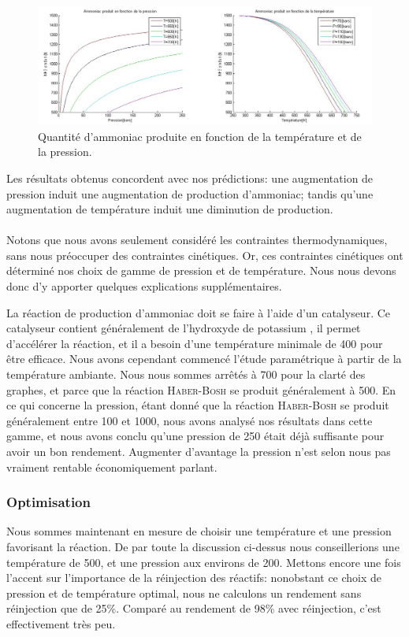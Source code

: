 \begin{figure}[ht!]
\centering
\includegraphics[scale=0.4]{fct_pression.jpg}
\caption{Quantité d'ammoniac produite en fonction de la température et de la pression.}
\label{fct_pression}
\end{figure}

Les résultats obtenus concordent avec nos prédictions: une augmentation de pression induit une augmentation de production d'ammoniac; tandis qu'une augmentation de température induit une
diminution de production.

\paragraph{} Notons que nous avons seulement considéré les contraintes thermodynamiques, sans nous préoccuper des contraintes
cinétiques. Or, ces contraintes cinétiques ont déterminé nos choix de gamme de pression et de température. Nous nous
devons donc d'y apporter quelques explications supplémentaires.

La réaction de production d'ammoniac doit se faire à l'aide d'un catalyseur. Ce catalyseur contient généralement de
l'hydroxyde de potassium , il permet d'accélérer la réaction, et il a besoin d'une température minimale de \unit{400}{\celsius}
pour être efficace. Nous avons cependant commencé l'étude paramétrique à partir de la température ambiante. Nous nous sommes
arrêtés à \unit{700}{\celsius} pour la clarté des graphes, et parce que la réaction \textsc{Haber-Bosh} se produit généralement à \unit{500}{\celsius}.
En ce qui concerne la pression, étant donné que la réaction \textsc{Haber-Bosh} se produit généralement entre \unit{100}{\bbar} et \unit{1000}{\bbar},
nous avons analysé nos résultats dans cette gamme, et nous avons conclu qu'une pression de \unit{250}{\bbar} était déjà
suffisante pour avoir un bon rendement. Augmenter d'avantage la pression n'est selon nous pas vraiment rentable économiquement parlant.


\subsubsection{Optimisation}
Nous sommes maintenant en mesure de choisir une température et une pression favorisant la réaction. De par
toute la discussion ci-dessus nous conseillerions une température de \unit{500}{\celsius}, et une pression aux environs de \unit{200}{\bbar}. Mettons encore une fois l'accent sur l'importance de la réinjection des réactifs: nonobstant ce choix de pression et de température optimal, nous ne calculons un rendement sans réinjection que de 25\%. Comparé au rendement de 98\% avec réinjection, c'est effectivement très peu.


